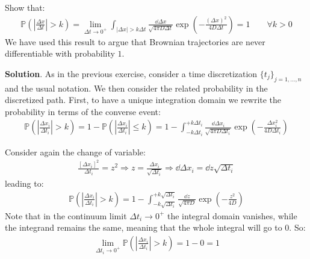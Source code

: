 \documentclass[../template.tex]{subfiles}
\begin{document}
\begin{exo}
    Show that:
    \begin{align*}
        \mathbb{P}\left(\left|\frac{\Delta x}{\Delta t}  \right| > k\right) = \lim_{\Delta t \to 0^+} \int_{|\Delta x| > k \Delta t} \frac{\dd{\Delta x }}{\sqrt{4 \pi D \Delta t}}\exp\left(-\frac{(\Delta x)^2}{4 D \Delta t} \right) = 1 \qquad \forall k > 0
    \end{align*}
    We have used this result to argue that Brownian trajectories are never differentiable with probability $1$. 

    \medskip

    \textbf{Solution}. As in the previous exercise, consider a time discretization $\{t_j\}_{j=1,\dots,n}$ and the usual notation. 
    We then consider the related probability in the discretized path. First, to have a unique integration domain we rewrite the probability in terms of the converse event:
    \begin{align*}
        \mathbb{P}\left(\left|\frac{\Delta x_i}{\Delta t_i }  \right| > k\right) = 1- \mathbb{P}\left(\left|\frac{\Delta x_i}{\Delta t_i }  \right| \leq k\right) = 1-\int_{-k \Delta t_i}^{+k \Delta t_i} \frac{\dd{\Delta x_i}}{\sqrt{4 \pi D \Delta t_i}} \exp\left(-\frac{\Delta x_i^2}{4 D \Delta t_i} \right)
    \end{align*}

    Consider again the change of variable:
    \begin{align*}
        \frac{[\Delta x_i]^2}{\Delta t_i} = z^2 \Rightarrow z = \frac{\Delta x_i }{\sqrt{ \Delta t_i}}    \Rightarrow \dd{\Delta x_i} = \dd{z} \sqrt{\Delta t_i}
    \end{align*}
    leading to:
    \begin{align*}
        \mathbb{P}\left(\left|\frac{\Delta x_i}{\Delta t_i }  \right| > k\right) = 1 - \int_{-k\sqrt{\Delta t_i}}^{+k \sqrt{\Delta t_i}} \frac{\dd{z}}{\sqrt{4 \pi D}}  \exp\left(-\frac{z^2}{4 D} \right) 
    \end{align*}
    Note that in the continuum limit $\Delta t_i \to 0^+$ the integral domain vanishes, while the integrand remains the same, meaning that the whole integral will go to $0$. So:
    \begin{align*}
        \lim_{\Delta t_i \to 0^+} \mathbb{P}\left(\left|\frac{\Delta x_i}{\Delta t_i }  \right| > k\right)  = 1 -0 = 1
    \end{align*}
\end{exo}

\setcounter{chapter}{3}
\end{document}
